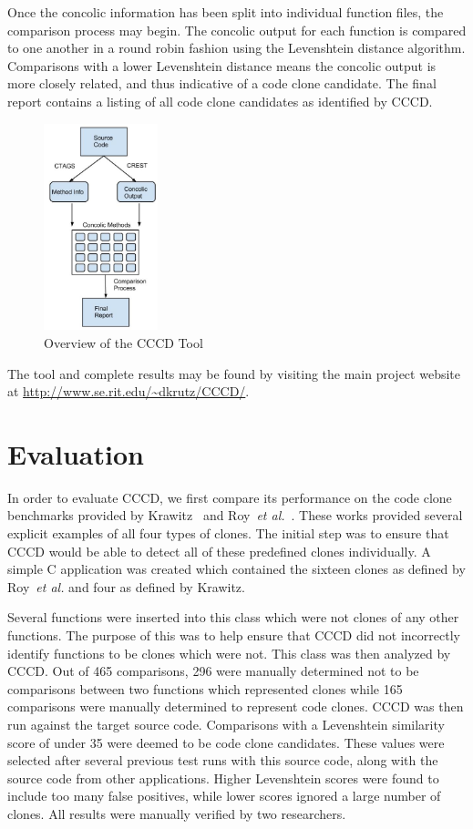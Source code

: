 \documentclass[conference]{IEEEtran}
\begin{document}
Once the concolic information has been split into individual function files, the comparison process may begin. The concolic output for each function is compared to one another in a round robin fashion using the Levenshtein distance algorithm. Comparisons with a lower Levenshtein distance means the concolic output is more closely related, and thus indicative of a code clone candidate. The final report contains a listing of all code clone candidates as identified by CCCD.

\begin{figure}[thb!]
\vspace{2mm}
\centering
\includegraphics[width=33mm,height=60mm]{images/CCCDStructure_2.jpg}
\caption{Overview of the CCCD Tool}
\label{fig:cccdstructure}
\end{figure}


The tool and complete results may be found by visiting the main project website at \url{http://www.se.rit.edu/\~dkrutz/CCCD/}.


\section{Evaluation}
\label{sec: evaluation}


In order to evaluate CCCD, we first compare its performance on the code clone benchmarks provided by Krawitz~\cite{Kraw2012} and Roy~\emph{et al.}~\cite{Roy:2009:CEC:1530898.1531101}. These works provided several explicit examples of all four types of clones. The initial step was to ensure that CCCD would be able to detect all of these predefined clones individually. A simple C application was created which contained the sixteen clones as defined by Roy~\emph{et al.} and four as defined by Krawitz. 

Several functions were inserted into this class which were not clones of any other functions. The purpose of this was to help ensure that CCCD did not incorrectly identify functions to be clones which were not. This class was then analyzed by CCCD. Out of 465 comparisons, 296 were manually determined not to be comparisons between two functions which represented clones while 165 comparisons were manually determined to represent code clones. CCCD was then run against the target source code. Comparisons with a Levenshtein similarity score of under 35 were deemed to be code clone candidates. These values were selected after several previous test runs with this source code, along with the source code from other applications. Higher Levenshtein scores were found to include too many false positives, while lower scores ignored a large number of clones. All results were manually verified by two researchers.
\end{document}
